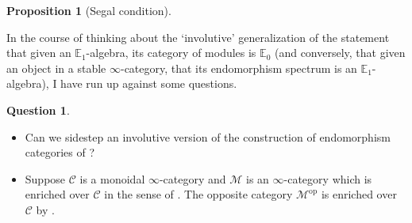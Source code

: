 \documentclass{article}
\newcommand{\EE}{\mathbb{E}}
\newcommand{\op}{\mathrm{op}}
\newtheorem{proposition}[equation]{Proposition}
\theoremstyle{definition}
\newtheorem{question}[equation]{Question}
\begin{document}
\begin{proposition}
    [Segal condition] 
\end{proposition}
In the course of thinking about the `involutive' generalization of the statement that given an $ \EE_1 $-algebra, its category of modules is $ \EE_0 $ (and conversely, that given an object in a stable $\infty$-category, that its endomorphism spectrum is an $ \EE_1 $-algebra), I have run up against some questions. 
\begin{question}
\begin{itemize}
    \item Can we sidestep an involutive version of the construction of endomorphism categories of \cite[\S4.7.1]{LurHA}? 
    \item Suppose $ \mathcal{C} $ is a monoidal $ \infty $-category and $ \mathcal{M} $ is an $ \infty $-category which is enriched over $ \mathcal{C} $ in the sense of \cite[\S4.2.1]{LurHA}. 
    The opposite category $ \mathcal{M}^\op $ is enriched over $ \mathcal{C} $ by \cite[\S10]{Heine_2023}.   
\end{itemize}
\end{question}
\end{document}
